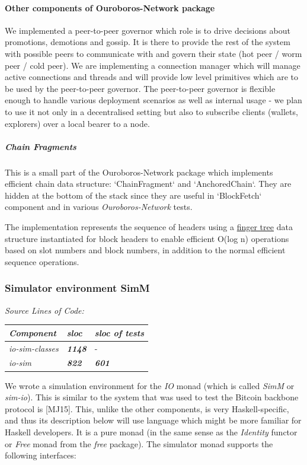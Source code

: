 \documentclass[11pt,a4paper]{article}
\begin{document}
\paragraph{Other components of Ouroboros-Network package}

We implemented a peer-to-peer governor which role is to drive decisions
about promotions, demotions and gossip. It is there to provide the rest
of the system with possible peers to communicate with and govern their
state (hot peer / worm peer / cold peer). We are implementing a
connection manager which will manage active connections and threads and
will provide low level primitives which are to be used by the
peer-to-peer governor. The peer-to-peer governor is flexible enough to
handle various deployment scenarios as well as internal usage - we plan
to use it not only in a decentralised setting but also to subscribe
clients (wallets, explorers) over a local bearer to a node.

\subparagraph{Chain Fragments}
\label{chain-fragments}

This is a small part of the Ouroboros-Network package which implements
efficient chain data structure: `ChainFragment` and `AnchoredChain`.
They are hidden at the bottom of the stack since they are useful in
`BlockFetch` component and in various \emph{Ouroboros-Network} tests.

The implementation represents the sequence of headers using a
\href{http://www.staff.city.ac.uk/~ross/papers/FingerTree.html}{finger
tree} data structure instantiated for block headers to enable efficient
O(log n) operations based on slot numbers and block numbers, in addition
to the normal efficient sequence operations.

\subsubsection{Simulator environment SimM}
\label{simulator-environment-simm}

\emph{Source Lines of Code:\\
}

\begin{longtable}[]{@{}lll@{}}
\toprule
\emph{Component} & \emph{sloc} & \emph{sloc of tests}\tabularnewline
\midrule
\endhead
\emph{io-sim-classes} & \emph{\textbf{1148}} & -\tabularnewline
\emph{io-sim} & \emph{\textbf{822}} & \emph{\textbf{601}}\tabularnewline
\bottomrule
\end{longtable}

We wrote a simulation environment for the \emph{IO} monad (which is
called \emph{SimM} or \emph{sim-io}). This is similar to the system that
was used to test the Bitcoin backbone protocol is {[}MJ15{]}. This,
unlike the other components, is very Haskell-specific, and thus its
description below will use language which might be more familiar for
Haskell developers. It is a pure monad (in the same sense as the
\emph{Identity} functor or \emph{Free} monad from the \emph{free}
package). The simulator monad supports the following interfaces:
\end{document}
